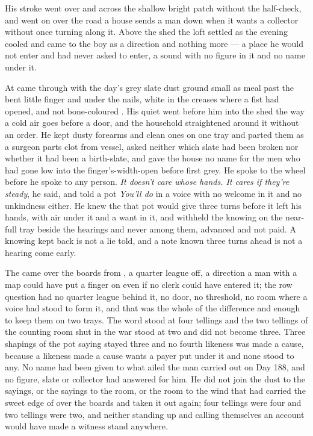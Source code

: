 His stroke went over  and across the shallow bright patch without the half-check, and went on over the road a house sends a man down when it wants a collector without once turning along it. Above the shed the loft settled as the evening cooled and came to the boy as a direction and nothing more --- a place he would not enter and had never asked to enter, a sound with no figure in it and no name under it.

At   came through with the day's grey slate dust ground small as meal past the bent little finger and under the nails, white in the creases where a fist had opened, and not bone-coloured . His quiet went before him into the shed the way a cold air goes before a door, and the household straightened around it without an order. He kept dusty forearms and clean ones on one tray and parted them as a surgeon parts clot from vessel, asked neither which slate had been broken nor whether it had been a birth-slate, and gave the house no name for the men who had gone low into the finger's-width-open  before first grey. He spoke to the wheel before he spoke to any person. \emph{It doesn’t care whose hands. It cares if they’re steady}, he said, and told a pot \emph{You’ll do} in a voice with no welcome in it and no unkindness either. He knew the  that pot would give three turns before it left his hands, with air under it and a want in it, and withheld the knowing on the near-full tray beside the hearings and never among them, advanced and not paid. A knowing kept back is not a lie told, and a note known three turns ahead is not a hearing come early.

The  came over the boards from , a quarter league off, a direction a man with a map could have put a finger on even if no clerk could have entered it; the row question had no quarter league behind it, no door, no threshold, no room where a voice had stood to form it, and that was the whole of the difference and enough to keep them on two trays. The word stood at four tellings and the two tellings of the counting room shut in the war stood at two and did not become three. Three shapings of the pot saying stayed three and no fourth likeness was made a cause, because a likeness made a cause wants a payer put under it and none stood to any. No name had been given to what ailed the man carried out on Day 188, and no figure, slate or collector had answered for him. He did not join the dust to the sayings, or the sayings to the room, or the room to the wind that had carried the sweet edge of  over the boards and taken it out again; four tellings were four and two tellings were two, and neither standing up and calling themselves an account would have made a witness stand anywhere.

